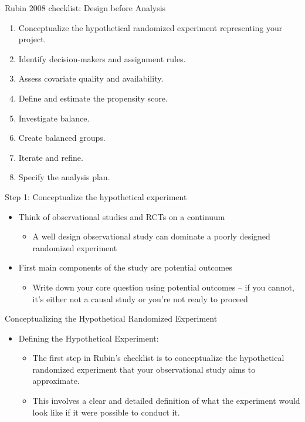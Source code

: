 \documentclass{beamer}
\begin{document}
\begin{frame}{Rubin 2008 checklist: Design before Analysis}

\begin{enumerate}
\item Conceptualize the hypothetical randomized experiment representing your project.
\item Identify decision-makers and assignment rules.
\item Assess covariate quality and availability.
\item Define and estimate the propensity score.
\item Investigate balance.
\item Create balanced groups.
\item Iterate and refine.
\item Specify the analysis plan.
\end{enumerate}

\end{frame}

\begin{frame}{Step 1: Conceptualize the hypothetical experiment}

\begin{itemize}

\item Think of observational studies and RCTs on a continuum 
	\begin{itemize}
	\item A well design observational study can dominate a poorly designed randomized experiment
	\end{itemize}
\item First main components of the study are potential outcomes 
	\begin{itemize}
	\item Write down your core question using potential outcomes -- if you cannot, it's either not a causal study or you're not ready to proceed
	\end{itemize}
\end{itemize}

\end{frame}



\begin{frame}{Conceptualizing the Hypothetical Randomized Experiment}
  \begin{itemize}
    \item Defining the Hypothetical Experiment:
      \begin{itemize}
        \item The first step in Rubin’s checklist is to conceptualize the hypothetical randomized experiment that your observational study aims to approximate.
        \item This involves a clear and detailed definition of what the experiment would look like if it were possible to conduct it.
      \end{itemize}
  \end{itemize}
\end{frame}
\end{document}

